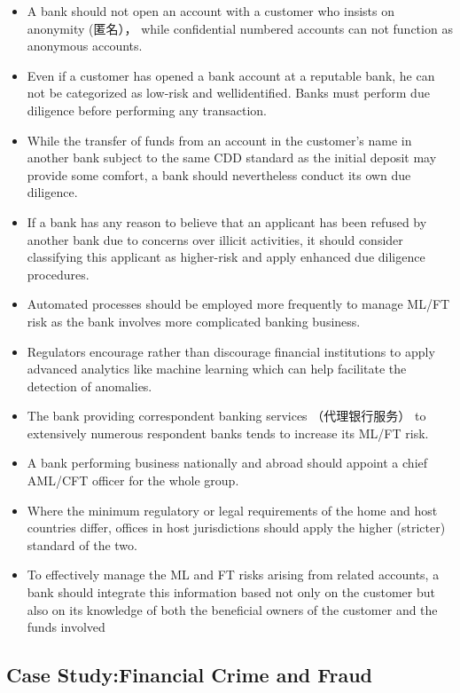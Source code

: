 \begin{itemize}
\begin{itemize}
    \end{itemize}
    
\item A bank should not open an account with a customer who insists on anonymity (匿名）， while confidential numbered accounts can not function as anonymous accounts.
\item Even if a customer has opened a bank account at a reputable bank, he can not be categorized as low-risk and wellidentified. Banks must perform due diligence before performing any transaction.
\item While the transfer of funds from an account in the customer's name in another bank subject to the same CDD standard as the initial deposit may provide some comfort, a bank should nevertheless conduct its own due diligence.
\item If a bank has any reason to believe that an applicant has been refused by another bank due to concerns over illicit activities, it should consider classifying this applicant as higher-risk and apply enhanced due diligence procedures.
\item Automated processes should be employed more frequently to manage ML/FT risk as the bank involves more complicated banking business.
\item Regulators encourage rather than discourage financial institutions to apply advanced analytics like machine learning which can help facilitate the detection of anomalies.
\item The bank providing correspondent banking services （代理银行服务） to extensively numerous respondent banks tends to increase its ML/FT risk.
\item A bank performing business nationally and abroad should appoint a chief AML/CFT officer for the whole group.
\item Where the minimum regulatory or legal requirements of the home and host countries differ, offices in host jurisdictions should apply the higher (stricter) standard of the two.
\item To effectively manage the ML and FT risks arising from related accounts, a bank should integrate this information based not only on the customer but also on its knowledge of both the beneficial owners of the customer and the funds involved

\end{itemize}


\subsection{ Case Study:Financial Crime and Fraud}



